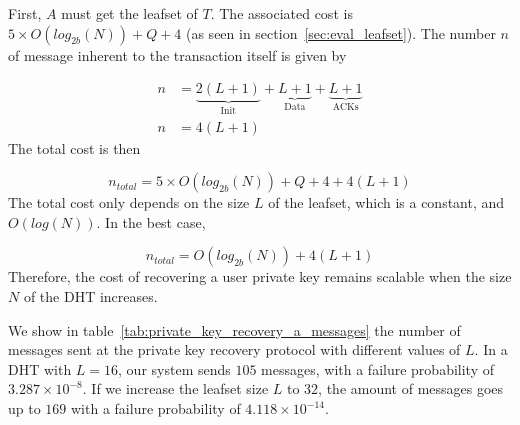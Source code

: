     First, $A$ must get the leafset of $T$. The associated cost is $5
\times O(log_{2b}(N)) + Q + 4$ (as seen in section~\ref{sec:eval_leafset}).
    The number $n$ of message inherent to the transaction itself is given by

    \begin{align}
      n &= \underbrace{2(L+1)}_\text{Init} + \underbrace{L+1}_\text{Data} +  \underbrace{L+1}_\text{ACKs}\\
      n &= 4(L+1)
    \end{align}
     The total cost is then

    $$
      n_{total} = 5 \times O(log_{2b}(N)) + Q + 4 + 4(L+1)
    $$    
    The total cost only depends on the size $L$ of the leafset, which is a
constant, and $O(log(N))$. In the best case, 

    $$
      n_{total} = O(log_{2b}(N)) + 4(L+1)
    $$
    Therefore, the cost of recovering a user private key remains
scalable when the size $N$ of the DHT increases.

    We show in table~\ref{tab:private_key_recovery_a_messages} the number of messages sent at
the private key recovery protocol with different values of $L$. In a DHT with
$L = 16$, our system sends $105$ messages, with a failure probability of
 $3.287 \times 10^{-8}$. If we increase the leafset size $L$ to $32$, the amount of
messages goes up to $169$ with a failure probability of $4.118 \times 10^{-14}$.

